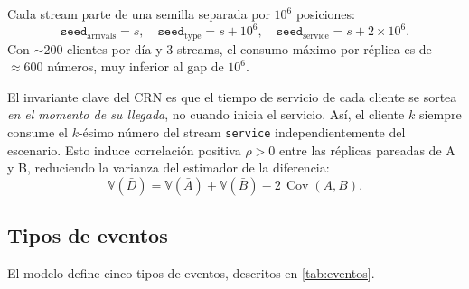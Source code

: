 Cada stream parte de una semilla separada por $10^6$ posiciones:
\[
  \texttt{seed}_{\text{arrivals}} = s, \quad
  \texttt{seed}_{\text{type}}     = s + 10^6, \quad
  \texttt{seed}_{\text{service}}  = s + 2 \times 10^6.
\]
Con ${\sim}200$ clientes por día y 3 streams, el consumo máximo por réplica
es de ${\approx}600$ números, muy inferior al gap de $10^6$.

El invariante clave del CRN es que el tiempo de servicio de cada cliente se
sortea \emph{en el momento de su llegada}, no cuando inicia el servicio.
Así, el cliente $k$ siempre consume el $k$-ésimo número del stream
\texttt{service} independientemente del escenario.
Esto induce correlación positiva $\rho > 0$ entre las réplicas pareadas de
A y B, reduciendo la varianza del estimador de la diferencia:
\[
  \mathbb{V}(\bar{D}) = \mathbb{V}(\bar{A}) + \mathbb{V}(\bar{B}) - 2\,\operatorname{Cov}(A,B).
\]

\subsection{Tipos de eventos}

El modelo define cinco tipos de eventos, descritos en \cref{tab:eventos}.

